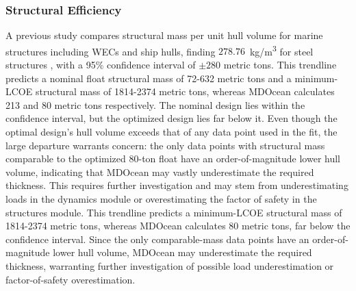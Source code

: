 \subsubsection{Structural Efficiency}
A previous study compares structural mass per unit hull volume for marine structures including WECs and ship hulls, finding $278.76$~kg/m\textsuperscript{3} for steel structures \cite{roberts_bringing_2021}, with a 95\% confidence interval of $\pm280$ metric tons.
\ifdefined\DISSERTATION
    This trendline predicts a nominal float structural mass of 72-632 metric tons and a minimum-LCOE structural mass of 1814-2374 metric tons, whereas MDOcean calculates 213 and 80 metric tons respectively.
    The nominal design lies within the confidence interval, but the optimized design lies far below it.
    Even though the optimal design's hull volume exceeds that of any data point used in the fit, the large departure warrants concern: the only data points with structural mass comparable to the optimized 80-ton float have an order-of-magnitude lower hull volume, indicating that MDOcean may vastly underestimate the required thickness.
    This requires further investigation and may stem from underestimating loads in the dynamics module or overestimating the factor of safety in the structures module.
\else
    This trendline predicts a minimum-LCOE structural mass of 1814-2374 metric tons, whereas MDOcean calculates 80 metric tons, far below the confidence interval.
    Since the only comparable-mass data points have an order-of-magnitude lower hull volume, MDOcean may underestimate the required thickness, warranting further investigation of possible load underestimation or factor-of-safety overestimation.
\fi


